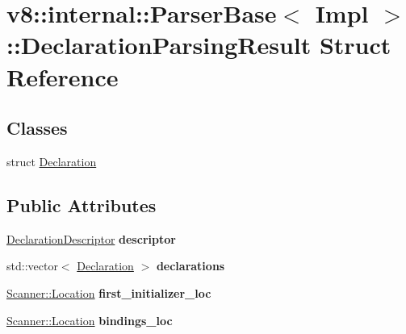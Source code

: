 \hypertarget{structv8_1_1internal_1_1ParserBase_1_1DeclarationParsingResult}{}\section{v8\+:\+:internal\+:\+:Parser\+Base$<$ Impl $>$\+:\+:Declaration\+Parsing\+Result Struct Reference}
\label{structv8_1_1internal_1_1ParserBase_1_1DeclarationParsingResult}
\subsection*{Classes}
\begin{DoxyCompactItemize}
\item 
struct \mbox{\hyperlink{structv8_1_1internal_1_1ParserBase_1_1DeclarationParsingResult_1_1Declaration}{Declaration}}
\end{DoxyCompactItemize}
\subsection*{Public Attributes}
\begin{DoxyCompactItemize}
\item 
\mbox{\label{structv8_1_1internal_1_1ParserBase_1_1DeclarationParsingResult_a290920940b1957ce84e19f30ffeea0ff}} 
\mbox{\hyperlink{structv8_1_1internal_1_1ParserBase_1_1DeclarationDescriptor}{Declaration\+Descriptor}} {\bfseries descriptor}
\item 
\mbox{\label{structv8_1_1internal_1_1ParserBase_1_1DeclarationParsingResult_a7d639f33360cdddd56f46ac608943ca1}} 
std\+::vector$<$ \mbox{\hyperlink{structv8_1_1internal_1_1ParserBase_1_1DeclarationParsingResult_1_1Declaration}{Declaration}} $>$ {\bfseries declarations}
\item 
\mbox{\label{structv8_1_1internal_1_1ParserBase_1_1DeclarationParsingResult_a56e126374757b920c1df952125dbc51c}} 
\mbox{\hyperlink{structv8_1_1internal_1_1Scanner_1_1Location}{Scanner\+::\+Location}} {\bfseries first\+\_\+initializer\+\_\+loc}
\item 
\mbox{\label{structv8_1_1internal_1_1ParserBase_1_1DeclarationParsingResult_a5aa3e63952af8278887756f29d162fa2}} 
\mbox{\hyperlink{structv8_1_1internal_1_1Scanner_1_1Location}{Scanner\+::\+Location}} {\bfseries bindings\+\_\+loc}
\end{DoxyCompactItemize}


